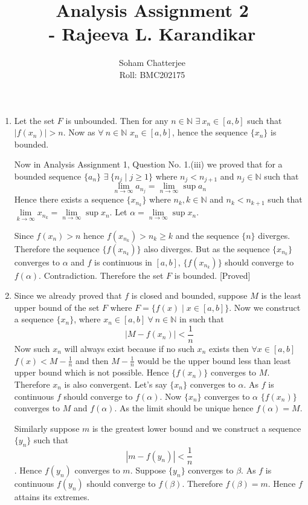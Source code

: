 \documentclass{article}
\title{\huge{Analysis Assignment 2\\ \hspace{5cm}- Rajeeva L. Karandikar}}
\author{Soham Chatterjee\\Roll: BMC202175}
\date{}
\newcommand{\mN}{\mathbb{N}}
\begin{document}
	\maketitle\pagebreak
	\begin{enumerate}
		\item Let the set $F$ is unbounded. Then for any  $n\in\mN$ $\exists\  x_n\in [a,b]$ such that $|f(x_n)|>n$. Now as $\forall\ n\in\mN$ $x_n\in[a,b]$, hence the sequence $\{x_n\}$ is bounded.
		
		\hspace{1cm}Now in Analysis Assignment 1, Question No. 1.(iii) we proved that  for a bounded sequence $\{a_n\}$ $\exists\ \{n_j\mid j\geq 1\}$ where $n_j<n_{j+1}$ and $n_j\in\mN$ such that $$\lim\limits_{n\to\infty}a_{n_j}=\lim\limits_{n\to\infty}\sup a_n$$Hence there exists a sequence $\{x_{n_k}\}$ where $n_k,k\in\mN$ and $n_k<n_{k+1}$ such that $\lim\limits_{k\to \infty}x_{n_k}=\lim\limits_{n\to\infty}\sup x_n$. Let $\alpha=\lim\limits_{n\to\infty}\sup x_n$.
		
		\hspace{1cm}Since $f(x_n)>n$ hence $f(x_{n_k})>n_k\geq k$ and the sequence $\{n\}$ diverges. Therefore the sequence $\{f(x_{n_k})\}$ also diverges. But as the sequence $\{x_{n_k}\}$ converges to $\alpha$ and $f$ is continuous in $[a,b]$, $\{f(x_{n_k})\}$ should converge to $f(\alpha)$. Contradiction. Therefore the set $F$ is bounded. [Proved]
		\item Since we already proved that $f$ is closed and bounded, suppose $M$ is the least upper bound of the set $F$ where $F=\{f(x)\mid x\in[a,b]\}$. Now  we construct a sequence $\{x_n\}$, where $x_n\in[a,b]\ \forall\ n\in\mN$ in such that $$|M-f(x_n)|<\frac1n$$Now such $x_n$ will always exist because if no such $x_n$ exists then $\forall x\in[a,b]$ $f(x)<M-\frac1n$ and then $M-\frac1n $ would be the upper bound less than least upper bound which is not possible. Hence $\{f(x_n)\}$ converges to $M$. Therefore $x_n$ is also convergent. Let's say $\{x_n\}$ converges to $\alpha$. As $f$ is continuous $f$ should converge to $f(\alpha)$. Now $\{x_n\} $ converges to $\alpha$ $\{f(x_n)\}$ converges to $M$ and $f(\alpha)$. As the limit should be unique hence $f(\alpha)=M$.
		
		\hspace{1cm}Similarly suppose $m$ is the greatest lower bound and we construct a sequence $\{y_n\}$ such that $$|m-f(y_n)|<\frac1n$$. Hence $f(y_n)$ converges to $m$. Suppose $\{y_n\}$ converges to $\beta$. As $f$ is continuous $f(y_n)$ should converge to $f(\beta)$.  Therefore $f(\beta)=m$. Hence $f$ attains its extremes.
		

\end{enumerate}
\end{document}

